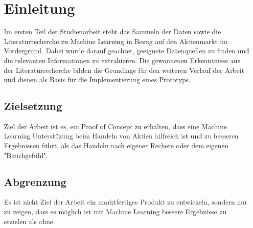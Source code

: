 \section{Einleitung}\label{sec: Einleitung}
Im ersten Teil der Studienarbeit steht das Sammeln der Daten sowie die Literaturrecherche zu Machine Learning in Bezug auf den Aktienmarkt im Vordergrund. Dabei wurde darauf geachtet, geeignete Datenquellen zu finden und die relevanten Informationen zu extrahieren. Die gewonnenen Erkenntnisse aus der Literaturrecherche bilden die Grundlage für den weiteren Verlauf der Arbeit und dienen als Basis für die Implementierung eines Prototyps.

\subsection{Zielsetzung}\label{sec: Zielsetzung}
Ziel der Arbeit ist es, ein Proof of Concept zu erhalten, dass eine Machine Learning Unterstüzung beim Handeln von Aktien hilfreich ist und zu besseren Ergebnissen führt, als das Handeln nach eigener Rechere oder dem eigenen "Bauchgefühl".

\subsection{Abgrenzung}\label{sec: Abgrenzung}
Es ist nicht Ziel der Arbeit ein marktfertiges Produkt zu entwickeln, sondern nur zu zeigen, dass es möglich ist mit Machine Learning bessere Ergebnisse zu erzielen als ohne.

